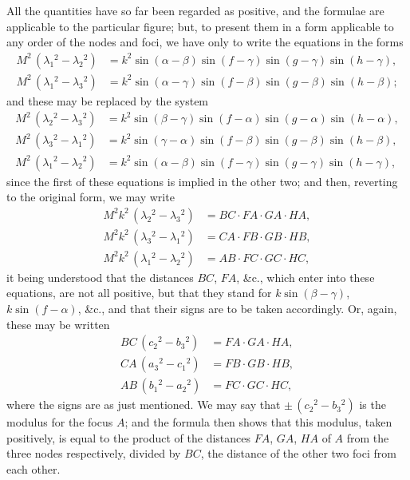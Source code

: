 \documentclass[12pt,a4paper]{article}
\begin{document}
\noindent
All the quantities have so far been regarded as positive, and the formulae are applicable to the particular figure; but, to present them in a form applicable to any order of the nodes and foci, we have only to write the equations in the forms
\begin{align*}
M^2\, (\lambda_1{}^{\!2} - \lambda_2{}^{\!2}) &= k^2 \sin(\alpha-\beta) \sin(f-\gamma) \sin(g-\gamma) \sin(h-\gamma), \\
M^2\, (\lambda_1{}^{\!2} - \lambda_3{}^{\!2}) &= k^2 \sin(\alpha-\gamma) \sin(f-\beta) \sin(g-\beta) \sin(h-\beta);
\end{align*}
and these may be replaced by the system
\begin{align*}
M^2\, (\lambda_2{}^{\!2} - \lambda_3{}^{\!2}) &= k^2 \sin(\beta-\gamma) \sin(f-\alpha) \sin(g-\alpha) \sin(h-\alpha), \\
M^2\, (\lambda_3{}^{\!2} - \lambda_1{}^{\!2}) &= k^2 \sin(\gamma-\alpha) \sin(f-\beta) \sin(g-\beta) \sin(h-\beta), \\
M^2\, (\lambda_1{}^{\!2} - \lambda_2{}^{\!2}) &= k^2 \sin(\alpha-\beta) \sin(f-\gamma) \sin(g-\gamma) \sin(h-\gamma),
\end{align*}
since the first of these equations is implied in the other two; and then, reverting to the original form, we may write
\begin{align*}
M^2 k^2\, (\lambda_2{}^{\!2} - \lambda_3{}^{\!2}) &= BC \cdot FA \cdot GA \cdot HA, \\
M^2 k^2\, (\lambda_3{}^{\!2} - \lambda_1{}^{\!2}) &= CA \cdot FB \cdot GB \cdot HB, \\
M^2 k^2\, (\lambda_1{}^{\!2} - \lambda_2{}^{\!2}) &= AB \cdot FC \cdot GC \cdot HC,
\end{align*}
it being understood that the distances $BC$, $FA$, \&c., which enter into these equations, are not all positive, but that they stand for $k\sin(\beta-\gamma)$, $k\sin(f-\alpha)$, \&c., and that their signs are to be taken accordingly. Or, again, these may be written
\begin{align*}
BC\, (c_2{}^{\!2} - b_3{}^{\!2}) &= FA \cdot GA \cdot HA, \\
CA\, (a_3{}^{\!2} - c_1{}^{\!2}) &= FB \cdot GB \cdot HB, \\
AB\, (b_1{}^{\!2} - a_2{}^{\!2}) &= FC \cdot GC \cdot HC,
\end{align*}
where the signs are as just mentioned. We may say that $\pm\,(c_2{}^{\!2}-b_3{}^{\!2})$ is the modulus for the focus $A$; and the formula then shows that this modulus, taken positively, is equal to the product of the distances $FA$, $GA$, $HA$ of $A$ from the three nodes respectively, divided by $BC$, the distance of the other two foci from each other.
\end{document}
